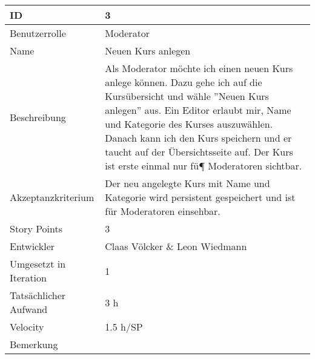 \begin{tabularx}{\textwidth}{|p{}|X|}
	\hline
	ID & 3\\
	\hline
	Benutzerrolle & Moderator\\
	\hline
	Name & Neuen Kurs anlegen\\
	\hline
	Beschreibung & Als Moderator möchte ich einen neuen Kurs anlege können. Dazu gehe ich auf die Kursübersicht und wähle ''Neuen Kurs anlegen'' aus. Ein Editor erlaubt mir, Name und Kategorie des Kurses auszuwählen. Danach kann ich den Kurs speichern und er taucht auf der Übersichtsseite auf. Der Kurs ist erste einmal nur fü¶ Moderatoren sichtbar.
\\
	\hline
	Akzeptanzkriterium & Der neu angelegte Kurs mit Name und Kategorie wird persistent gespeichert und ist für Moderatoren einsehbar.\\
	\hline
	Story Points & 3\\
	\hline
	Entwickler & Claas Völcker \& Leon Wiedmann\\
	\hline
	Umgesetzt in Iteration & 1\\
	\hline
	Tatsächlicher Aufwand & 3 h\\
	\hline
	Velocity & 1.5 h/SP\\
	\hline
	Bemerkung & \\
	\hline
\end{tabularx}
\vspace{20pt}
